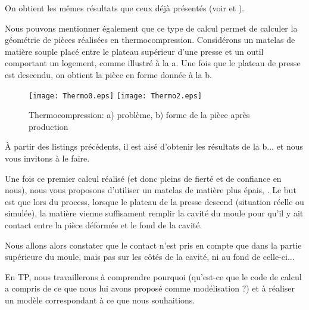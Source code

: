 On obtient les mêmes résultats que ceux déjà présentés (voir  et ).

\bigskip
Nous pouvons mentionner également que ce type de calcul permet de calculer la géométrie de
pièces réalisées en thermocompression.
Considérons un matelas de matière souple placé entre le plateau supérieur d'une presse et
un outil comportant un logement, comme illustré à la a.
Une fois que le plateau de presse est descendu, on obtient la pièce en forme donnée 
à la b.

\begin{figure}[ht]
   \center
   \texttt{[image: Thermo0.eps]} \hfill
   \texttt{[image: Thermo2.eps]}
   \caption{\label{Fig-Thermo} Thermocompression: a) problème, b) forme de la pièce après production}
\end{figure}

\medskip
À partir des listings précédents, il est aisé d'obtenir les résultats de la b...
et nous vous invitons à le faire.

\medskip
Une fois ce premier calcul réalisé (et donc pleins de fierté et de confiance en nous), nous vous proposons 
d'utiliser un matelas de matière plus épais, . 
Le but est que lors du process, lorsque le plateau de la presse descend (situation réelle ou simulée), 
la matière vienne suffisament remplir la cavité du moule pour qu'il y ait contact entre la pièce déformée 
et le fond de la cavité.

\bigskip
Nous allons alors constater que le contact n'est pris en compte que dans la partie supérieure du
moule, mais pas sur les côtés de la cavité, ni au fond de celle-ci...

En TP, nous travaillerons à comprendre pourquoi (qu'est-ce que le code de calcul a compris de ce 
que nous lui avons proposé comme modélisation ?) et à réaliser un modèle correspondant
à ce que nous souhaitions.
